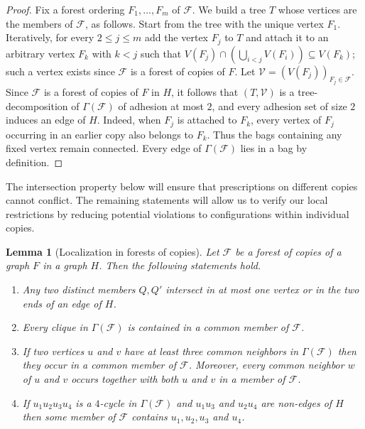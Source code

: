 \documentclass[11pt]{article}
\newtheorem{lemma}[theorem]{Lemma}
\theoremstyle{remark}
\begin{document}
\begin{proof}
    Fix a forest ordering $F_1, \ldots, F_m$ of $\mathcal{F}$.
    We build a tree $T$ whose vertices are the members of $\mathcal{F}$, as follows.
    Start from the tree with the unique vertex $F_1$.
    Iteratively, for every $2 \leq j \leq m$ add the vertex $F_j$ to $T$ and attach it to an arbitrary vertex $F_k$ with $k < j$ such that $V(F_j) \cap (\bigcup_{i < j}V(F_i)) \subseteq V(F_k)$; such a vertex exists since $\mathcal{F}$ is a forest of copies of $F$.
    Let $\mathcal{V} = (V(F_j))_{F_j \in \mathcal{F}}$.
    Since $\mathcal{F}$ is a forest of copies of $F$ in $H$, it follows that $(T, \mathcal{V})$ is a tree-decomposition of $\Gamma(\mathcal{F})$ of adhesion at most $2$, and every adhesion set of size $2$ induces an edge of $H$.
    Indeed, when $F_j$ is attached to $F_k$, every vertex of $F_j$ occurring in an earlier copy also belongs to $F_k$. 
    Thus the bags containing any fixed vertex remain connected. 
    Every edge of $\Gamma(\mathcal F)$ lies in a bag by definition.
\end{proof}

The intersection property below will ensure that prescriptions on different copies cannot conflict.
The remaining statements will allow us to verify our local restrictions by reducing potential violations to configurations within individual copies.

\begin{lemma}[Localization in forests of copies]\label{lem:properties-forest}
    Let $\mathcal{F}$ be a forest of copies of a graph $F$ in a graph $H$.
    Then the following statements hold. \begin{enumerate}[label=\alph*)]
        \item\label{itm:forest-no-nonedge} Any two distinct members $Q,Q'$ intersect in at most one vertex or in the two ends of an edge of $H$.
        \item\label{itm:clique-common-member} Every clique in $\Gamma(\mathcal{F})$ is contained in a common member of $\mathcal{F}$.
        \item\label{itm:3-nbrs-common-member} If two vertices $u$ and $v$ have at least three common neighbors in $\Gamma(\mathcal{F})$ then they occur in a common member of $\mathcal{F}$. Moreover, every common neighbor $w$ of $u$ and $v$ occurs together with both $u$ and $v$ in a member of $\mathcal{F}$.
        \item\label{itm:C4-common-member} If $u_1u_2u_3u_4$ is a $4$-cycle in $\Gamma(\mathcal{F})$ and $u_1u_3$ and $u_2u_4$ are non-edges of $H$ then some member of $\mathcal{F}$ contains $u_1, u_2, u_3$ and $u_4$.
    \end{enumerate}
\end{lemma}
\end{document}
